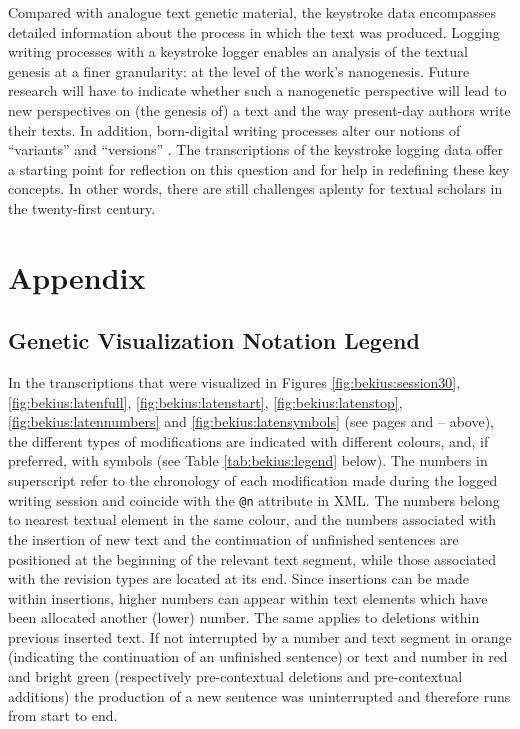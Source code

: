 \begin{paper}
\noindent
Compared with analogue text genetic material, the
keystroke data encompasses detailed information about the process in
which the text was produced. Logging writing processes with a keystroke
logger enables an analysis of the textual genesis at a finer
granularity: at the level of the work's nanogenesis. Future research will have to indicate whether such a nanogenetic
perspective will lead to new perspectives on (the genesis of) a text and
the way present-day authors write their texts. In addition, born-digital
writing processes alter our notions of ``variants'' and ``versions'' \citep{van_hulle_logica_2019}. The transcriptions of the keystroke logging data offer a
starting point for reflection on this question and for help in
redefining these key concepts. In other words, there are still challenges aplenty for textual
scholars in the twenty-first century.

\section*{Appendix}
\begin{subappendices}

\subsection{Genetic Visualization Notation Legend}
\label{app:bekius:legend}
In the transcriptions that were visualized in Figures \ref{fig:bekius:session30}, \ref{fig:bekius:latenfull}, \ref{fig:bekius:latenstart}, \ref{fig:bekius:latenstop}, \ref{fig:bekius:latennumbers} and \ref{fig:bekius:latensymbols} (see pages \pageref{fig:bekius:session30} and \pageref{fig:bekius:latenfull}--\pageref{fig:bekius:latensymbols} above), the different types of modifications are indicated with different colours, and, if preferred, with symbols (see Table \ref{tab:bekius:legend} below). The numbers in superscript refer to the chronology of each modification made during the logged writing session and coincide with the \lstinline[language=XML]!@n! attribute in XML. The numbers belong to nearest textual element in the same colour, and the numbers associated with the insertion of new text and the continuation of unfinished sentences are positioned at the beginning of the relevant text segment, while those associated with the revision types are located at its end. Since insertions can be made within insertions, higher numbers can appear within text elements which have been allocated another (lower) number. The same applies to deletions within previous inserted text. If not interrupted by a number and text segment in orange (indicating the continuation of an unfinished sentence) or text and number in red and bright green (respectively pre-contextual deletions and pre-contextual additions) the production of a new sentence was uninterrupted and therefore runs from start to end.


\end{subappendices}
\end{paper}
